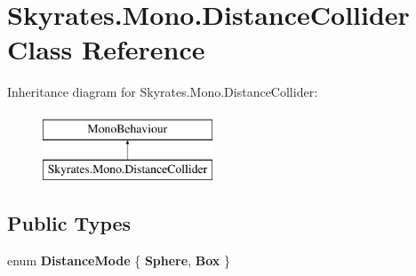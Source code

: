 \hypertarget{class_skyrates_1_1_mono_1_1_distance_collider}{\section{Skyrates.\-Mono.\-Distance\-Collider Class Reference}
\label{class_skyrates_1_1_mono_1_1_distance_collider}
}
Inheritance diagram for Skyrates.\-Mono.\-Distance\-Collider\-:\begin{figure}[H]
\begin{center}
\leavevmode
\includegraphics[height=2.000000cm]{class_skyrates_1_1_mono_1_1_distance_collider}
\end{center}
\end{figure}
\subsection*{Public Types}
\begin{DoxyCompactItemize}
\item 
enum {\bfseries Distance\-Mode} \{ {\bfseries Sphere}, 
{\bfseries Box}
 \}
\end{DoxyCompactItemize}
